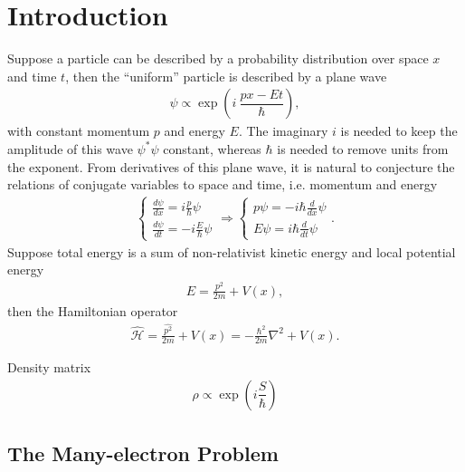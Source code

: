 \chapter{Introduction}

Suppose a particle can be described by a probability distribution over space $x$ and time $t$, then the ``uniform'' particle is described by a plane wave
\begin{align}
\psi \propto \exp\left(
i~\dfrac{px-Et}{\hbar}
\right),
\end{align}
with constant momentum $p$ and energy $E$. The imaginary $i$ is needed to keep the amplitude of this wave $\psi^*\psi$ constant, whereas $\hbar$ is needed to remove units from the exponent. From derivatives of this plane wave, it is natural to conjecture the relations of conjugate variables to space and time, i.e. momentum and energy
\begin{align}
\left\{
\begin{array}{l}
\frac{d\psi}{dx} =  i\frac{p}{\hbar}\psi \\ [8 pt]
\frac{d\psi}{dt} = -i\frac{E}{\hbar}\psi
\end{array}
\right. \Rightarrow
\left\{
\begin{array}{l}
p\psi = -i\hbar\frac{d}{dx} \psi \\ [8 pt]
E\psi =  i\hbar\frac{d}{dt} \psi
\end{array}
\right..
\end{align}
Suppose total energy is a sum of non-relativist kinetic energy and local potential energy
\begin{align}
E = \frac{p^2}{2m} + V(x),
\end{align}
then the Hamiltonian operator
\begin{align}
\hat{\mathcal{H}} = \frac{\hat{p^2}}{2m} + V(x) = -\frac{\hbar^2}{2m}\nabla^2 + V(x).
\end{align}

Density matrix
\begin{align}
\rho\propto\exp\left(i\dfrac{S}{\hbar}\right)
\end{align}

\section{The Many-electron Problem}
